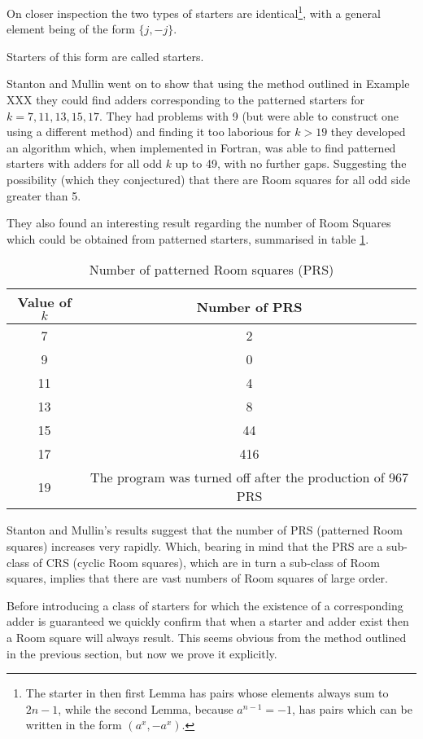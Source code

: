 On closer inspection the two types of starters are identical\footnote{The starter in then first Lemma has pairs whose elements always sum to $2n-1$, while the second Lemma, because $a^{n-1}=-1$, has pairs which can be written in the form $(a^x,-a^x)$.}, with a general element being of the form $\{j, -j\}$.

Starters of this form are called  starters.

Stanton and Mullin went on to show that using the method outlined in Example XXX they could find adders corresponding to the patterned starters for $k = 7, 11, 13, 15, 17$.
They had problems with 9 (but were able to construct one using a different method) and finding it too laborious for $k > 19$ they developed an algorithm which, when implemented in Fortran, was able to find patterned starters with adders for all odd $k$ up to 49, with no further gaps.
Suggesting the possibility (which they conjectured) that there are Room squares for all odd side greater than 5.

They also found an interesting result regarding the number of Room Squares which could be obtained from patterned starters, summarised in table \ref{tab:patterned}. 

\begin{table}[h!]
  \begin{center}
    \begin{tabular}{c|c}
    Value of $k$ & Number of PRS \\ \hline
    7 & 2 \\
    9 & 0 \\
    11 & 4 \\
    13 & 8 \\
    15 & 44 \\
    17 & 416 \\
    19 & The program was turned off after the production of 967 PRS
    \end{tabular}
  \end{center}
  \caption{Number of patterned Room squares (PRS)}
  \label{tab:patterned}
\end{table}

Stanton and Mullin’s results suggest that the number of PRS (patterned Room squares) increases very rapidly.
Which, bearing in mind that the PRS are a sub-class of CRS (cyclic Room squares), which are in turn a sub-class of Room squares, implies that there are vast numbers of Room squares of large order.

Before introducing a class of starters for which the existence of a corresponding adder is guaranteed we quickly confirm that when a starter and adder exist then a Room square will always result.
This seems obvious from the method outlined in the previous section, but now we prove it explicitly.

